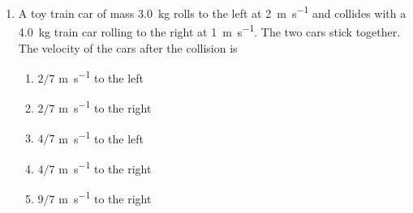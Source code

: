 \documentclass{../../oss-apphys}
\begin{document}
\genheader


\genmultidirections

\gengravity

\raggedcolumns
\begin{multicols}{2}

  \begin{enumerate}[leftmargin=18pt]

  \item A toy train car of mass \SI{3.0}{\kilo\gram} rolls to the left at
    \SI{2}{\metre\per\second} and collides with a \SI{4.0}{\kilo\gram} train
    car rolling to the right at \SI{1}{\metre\per\second}. The two cars stick
    together. The velocity of the cars after the collision is
    \begin{enumerate}[noitemsep,topsep=0pt,leftmargin=18pt,label=(\Alph*)]
    \item $2/7$ \si{\metre\per\second} to the left
    \item $2/7$ \si{\metre\per\second} to the right
    \item $4/7$ \si{\metre\per\second} to the left
    \item $4/7$ \si{\metre\per\second} to the right
    \item $9/7$ \si{\metre\per\second} to the right
    \end{enumerate}
    

\end{enumerate}
\end{multicols}
\end{document}
